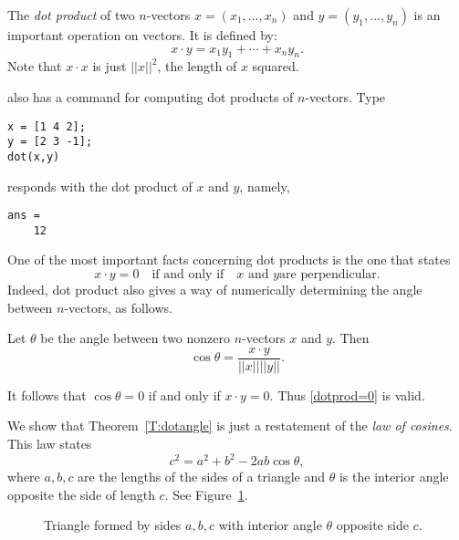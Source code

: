 \documentclass{ximera}
\begin{document}
The {\em dot product\/} of two $n$-vectors
$x=(x_1,\ldots,x_n)$ and $y=(y_1,\ldots,y_n)$ is an important
operation on vectors.  It is defined by:
\begin{equation}  \label{e:dotproduct}
x\cdot y = x_1y_1 + \cdots + x_ny_n.
\end{equation}
Note that $x\cdot x$ is just $||x||^2$, the length of $x$
squared.

\Matlab also has a command for computing dot products of
$n$-vectors.  Type
\begin{verbatim}
x = [1 4 2];
y = [2 3 -1];
dot(x,y)
\end{verbatim}
\Matlab responds with the dot product of $x$ and $y$, namely,
\begin{verbatim}
ans =
    12
\end{verbatim}

One of the most important facts concerning dot products is the
one that states
\begin{equation} \label{dotprod=0}
x\cdot y = 0 \quad \mbox{if and only if} \quad \mbox{$x$ and $y$
are perpendicular}.
\end{equation}  
Indeed, dot product also gives a way of numerically determining
the angle between $n$-vectors, as follows.
\begin{theorem} \label{T:dotangle}
Let $\theta$ be the angle between two nonzero $n$-vectors $x$
and $y$.  Then
\begin{equation}  \label{e:dotproductang}
\cos \theta = \frac{x\cdot y}{||x|| ||y||}.
\end{equation}
\end{theorem}
It follows that $\cos \theta=0$
if and only if $x\cdot y = 0$.  Thus \eqref{dotprod=0} is valid.

We show that Theorem~\ref{T:dotangle} is just a restatement of the
{\em law of cosines\/}.  This law states 
\[
c^2 = a^2 + b^2 - 2ab\cos\theta,
\]
where $a,b,c$ are the lengths of the sides of a triangle and $\theta$
is the interior angle opposite the side of length $c$.   See Figure~\ref{F:cosines}.

\begin{figure}[htb]
     \centerline{%
     }
     \caption{Triangle formed by sides $a,b,c$ with interior
	angle $\theta$ opposite side $c$.}
     \label{F:cosines}
\end{figure}
\end{document}

